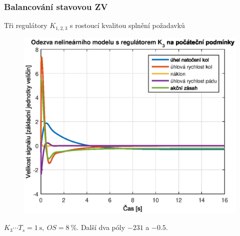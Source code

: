 \documentclass{beamer}
\begin{document}
    \begin{frame}


        
        \frametitle{Balancování stavovou ZV}

        Tři regulátory $K_{1,2,3}$ s rostoucí kvalitou splnění požadavků\\
        
        \begin{figure}[htbp]
            \centerline{\includegraphics[width=0.6\linewidth]{pp_regulator_K3.eps}}
            \label{fig:porovnani_skok}        
        \end{figure}
        $K_3 \cdots T_s = 1~\si{\second},~OS = 8~\%$. Další dva póly $-231$ a $-0.5$.
    \end{frame}
\end{document}
